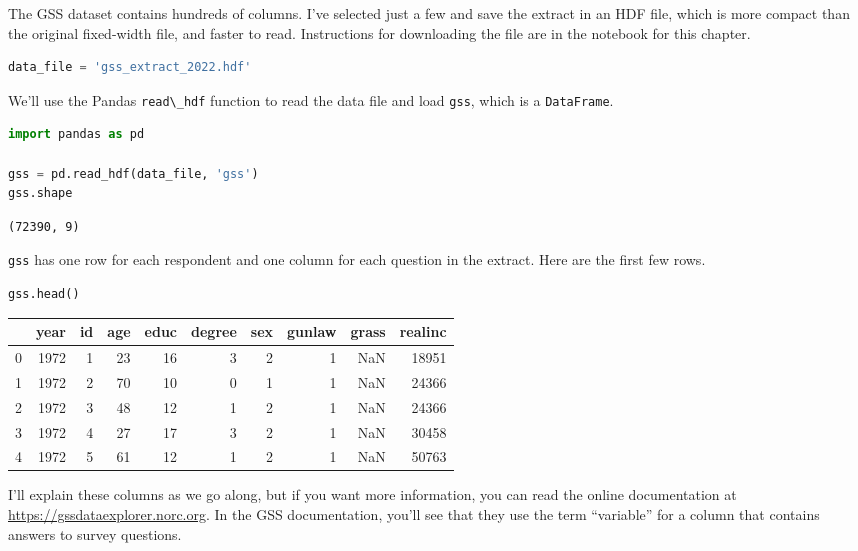 The GSS dataset contains hundreds of columns. I've selected just a few
and save the extract in an HDF file, which is more compact than the
original fixed-width file, and faster to read. Instructions for
downloading the file are in the notebook for this chapter.

\begin{lstlisting}[language=Python,style=source]
data_file = 'gss_extract_2022.hdf'
\end{lstlisting}

We'll use the Pandas \passthrough{\lstinline!read\_hdf!} function to
read the data file and load \passthrough{\lstinline!gss!}, which is a
\passthrough{\lstinline!DataFrame!}.

\begin{lstlisting}[language=Python,style=source]
import pandas as pd

gss = pd.read_hdf(data_file, 'gss')
gss.shape
\end{lstlisting}

\begin{lstlisting}[style=output]
(72390, 9)
\end{lstlisting}

\passthrough{\lstinline!gss!} has one row for each respondent and one
column for each question in the extract. Here are the first few rows.

\begin{lstlisting}[language=Python,style=source]
gss.head()
\end{lstlisting}

\begin{tabular}{lrrrrrrrrr}
\midrule
 & year & id & age & educ & degree & sex & gunlaw & grass & realinc \\
\midrule
0 & 1972 & 1 & 23 & 16 & 3 & 2 & 1 & NaN & 18951 \\
1 & 1972 & 2 & 70 & 10 & 0 & 1 & 1 & NaN & 24366 \\
2 & 1972 & 3 & 48 & 12 & 1 & 2 & 1 & NaN & 24366 \\
3 & 1972 & 4 & 27 & 17 & 3 & 2 & 1 & NaN & 30458 \\
4 & 1972 & 5 & 61 & 12 & 1 & 2 & 1 & NaN & 50763 \\
\midrule
\end{tabular}

I'll explain these columns as we go along, but if you want more
information, you can read the online documentation at
\url{https://gssdataexplorer.norc.org}. In the GSS documentation, you'll
see that they use the term ``variable'' for a column that contains
answers to survey questions.

